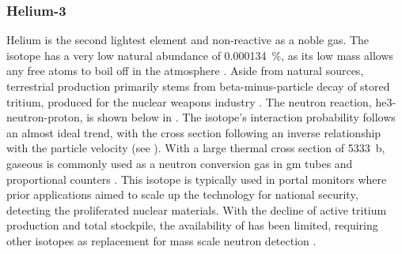 \documentclass[../../../../main.tex]{subfiles}
\begin{document}
%
    \subsubsection{Helium-3}%
    \label{sec:chapter-2:radiation-detection:neutron-interactions:helium-3}%
    Helium is the second lightest element and non-reactive as a noble gas.
    The isotope  has a very low natural abundance of \SI{0.000134}{\percent}, as its low mass allows any free atoms to boil off in the atmosphere \cite{Bievre_1984}.
    Aside from natural  sources, terrestrial production primarily stems from \gls{beta-minus-particle} decay of stored tritium, produced for the nuclear weapons industry \cite{Zerriffi_1996}.
    The  neutron reaction, \gls{he3-neutron-proton}, is shown below in .%
    The isotope's interaction probability follows an almost ideal  trend, with the cross section following an inverse relationship with the particle velocity (see ).
    With a large thermal cross section of \SI{5333}{\barn}, gaseous  is commonly used as a neutron conversion gas in \gls{gm} tubes and proportional counters \cite{Chadwick_2011,book:Dawidowski_2013}.
    This isotope is typically used in portal monitors where prior applications aimed to scale up the technology for national security, detecting the proliferated nuclear materials.
    With the decline of active tritium production and total stockpile, the availability of  has been limited, requiring other isotopes as replacement for mass scale neutron detection \cite{website:DOE:helium3, Kouzes_2015}.
\end{document}
